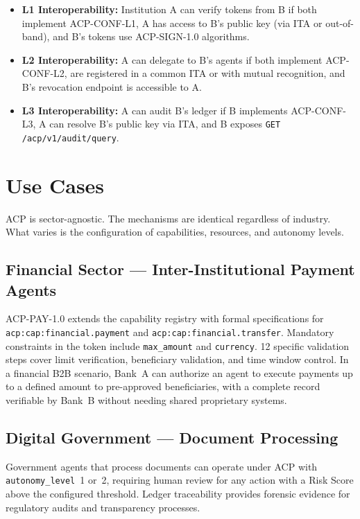 \documentclass[11pt]{article}
\theoremstyle{definition}
\begin{document}
\begin{itemize}[noitemsep]
  \item \textbf{L1 Interoperability:} Institution A can verify tokens from B if both implement ACP-CONF-L1,
        A has access to B's public key (via ITA or out-of-band), and B's tokens use ACP-SIGN-1.0 algorithms.
  \item \textbf{L2 Interoperability:} A can delegate to B's agents if both implement ACP-CONF-L2,
        are registered in a common ITA or with mutual recognition, and B's revocation endpoint is accessible to A.
  \item \textbf{L3 Interoperability:} A can audit B's ledger if B implements ACP-CONF-L3,
        A can resolve B's public key via ITA, and B exposes \texttt{GET /acp/v1/audit/query}.
\end{itemize}

\section{Use Cases}

ACP is sector-agnostic. The mechanisms are identical regardless of industry.
What varies is the configuration of capabilities, resources, and autonomy levels.

\subsection{Financial Sector --- Inter-Institutional Payment Agents}

ACP-PAY-1.0 extends the capability registry with formal specifications for
\texttt{acp:cap:financial.payment} and \texttt{acp:cap:financial.transfer}.
Mandatory constraints in the token include \texttt{max\_amount} and \texttt{currency}.
12 specific validation steps cover limit verification, beneficiary validation, and time window control.
In a financial B2B scenario, Bank~A can authorize an agent to execute payments up to a defined amount
to pre-approved beneficiaries, with a complete record verifiable by Bank~B
without needing shared proprietary systems.

\subsection{Digital Government --- Document Processing}

Government agents that process documents can operate under ACP with \texttt{autonomy\_level}~1 or~2,
requiring human review for any action with a Risk Score above the configured threshold.
Ledger traceability provides forensic evidence for regulatory audits and transparency processes.
\end{document}
